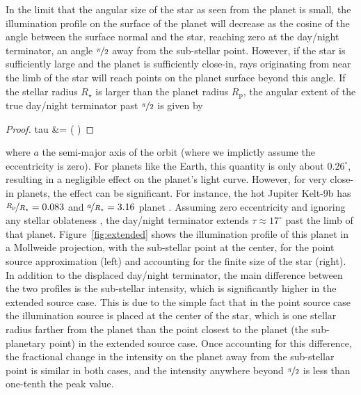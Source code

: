 \documentclass[modern]{aastex62}
\begin{document}
In the limit that the angular size of the star as seen from the planet is
small, the illumination profile on the surface of the planet will
decrease as the cosine of the angle between the surface normal and the star,
reaching zero at the day/night terminator, an angle $\nicefrac{\pi}{2}$
away from the sub-stellar point. However, if the star is sufficiently large
and the planet is sufficiently close-in, rays originating from near the limb
of the star will reach points on the planet surface beyond this angle.
If the stellar radius $R_\star$
is larger than the planet radius $R_\mathrm{p}$, the angular extent of the true
day/night terminator past $\nicefrac{\pi}{2}$ is given by
%
\begin{proof}{tau}
    \label{eq:tau}
    \tau &= \arcsin\left(  \right)
\end{proof}
%
where $a$ the semi-major axis of the orbit (where we implictly assume
the eccentricity is zero).
For planets like the Earth, this quantity is only about $0.26^\circ$,
resulting in a negligible effect on the planet's light curve. However,
for very close-in planets, the effect can be significant. For instance,
the hot Jupiter Kelt-9b has $\nicefrac{R_\mathrm{p}}{R_\star} = 0.083$ and
$\nicefrac{a}{R_\star} = 3.16$
planet \citep{Wong2019}. Assuming zero eccentricity and ignoring any
stellar oblateness
\citep[see][]{Ahlers2020},
the day/night terminator extends $\tau \approx 17^\circ$ past the limb
of that planet. Figure~\ref{fig:extended} shows the illumination profile
of this planet in a Mollweide projection, with the sub-stellar point at
the center, for the point source approximation (left) and accounting for
the finite size of the star (right). In addition to the
displaced day/night terminator, the main difference between
the two profiles is the sub-stellar intensity, which is significantly higher
in the extended source case. This is due to the simple fact that in the point
source case the illumination source is placed at the center of the star,
which is one stellar radius farther from the planet than the point closest
to the planet (the sub-planetary point) in the extended source case.
Once accounting for this difference, the fractional change in the intensity
on the planet away from the sub-stellar point is similar in both cases,
and the intensity anywhere beyond $\nicefrac{\pi}{2}$ is less than one-tenth
the peak value.
\end{document}

